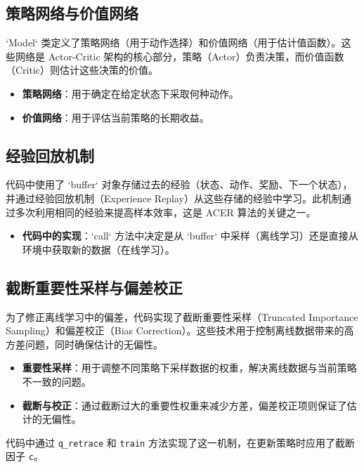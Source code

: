 \documentclass[twocolumn, 10pt]{article} %
\theoremstyle{remark}
\begin{document}
\subsection{策略网络与价值网络}

`Model` 类定义了策略网络（用于动作选择）和价值网络（用于估计值函数）。这些网络是 Actor-Critic 架构的核心部分，策略（Actor）负责决策，而价值函数（Critic）则估计这些决策的价值。

\begin{itemize}
    \item \textbf{策略网络}：用于确定在给定状态下采取何种动作。
    \item \textbf{价值网络}：用于评估当前策略的长期收益。
\end{itemize}

\subsection{经验回放机制}

代码中使用了 `buffer` 对象存储过去的经验（状态、动作、奖励、下一个状态），并通过经验回放机制（Experience Replay）从这些存储的经验中学习。此机制通过多次利用相同的经验来提高样本效率，这是 ACER 算法的关键之一。

\begin{itemize}
    \item \textbf{代码中的实现}：`call` 方法中决定是从 `buffer` 中采样（离线学习）还是直接从环境中获取新的数据（在线学习）。
\end{itemize}

\subsection{截断重要性采样与偏差校正}

为了修正离线学习中的偏差，代码实现了截断重要性采样（Truncated Importance Sampling）和偏差校正（Bias Correction）。这些技术用于控制离线数据带来的高方差问题，同时确保估计的无偏性。

\begin{itemize}
    \item \textbf{重要性采样}：用于调整不同策略下采样数据的权重，解决离线数据与当前策略不一致的问题。
    \item \textbf{截断与校正}：通过截断过大的重要性权重来减少方差，偏差校正项则保证了估计的无偏性。
\end{itemize}

代码中通过 \texttt{q\_retrace} 和 \texttt{train} 方法实现了这一机制，在更新策略时应用了截断因子 \texttt{c}。
\end{document}
